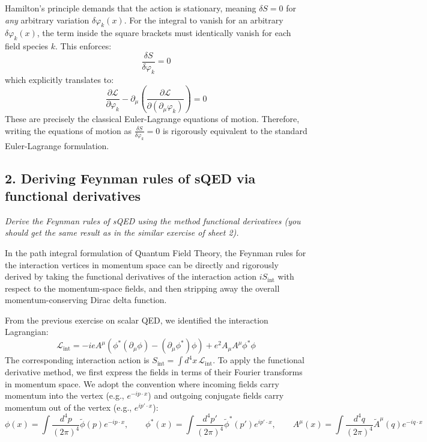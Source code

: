Hamilton's principle demands that the action is stationary, meaning $\delta S = 0$ for \textit{any} arbitrary variation $\delta\varphi_k(x)$. For the integral to vanish for an arbitrary $\delta\varphi_k(x)$, the term inside the square brackets must identically vanish for each field species $k$. This enforces:
\[
    \frac{\delta S}{\delta \varphi_k} = 0
\]
which explicitly translates to:
\[
    \frac{\partial \mathcal{L}}{\partial \varphi_k} - \partial_\mu \left( \frac{\partial \mathcal{L}}{\partial (\partial_\mu \varphi_k)} \right) = 0
\]
These are precisely the classical Euler-Lagrange equations of motion. Therefore, writing the equations of motion as $\frac{\delta S}{\delta \varphi_k} = 0$ is rigorously equivalent to the standard Euler-Lagrange formulation.


\subsection*{2. Deriving Feynman rules of sQED via functional derivatives}

\begin{center}
    \textit{Derive the Feynman rules of sQED using the method functional derivatives (you should get the same result as in the similar exercise of sheet 2).}
\end{center}

In the path integral formulation of Quantum Field Theory, the Feynman rules for the interaction vertices in momentum space can be directly and rigorously derived by taking the functional derivatives of the interaction action $iS_{\text{int}}$ with respect to the momentum-space fields, and then stripping away the overall momentum-conserving Dirac delta function.

From the previous exercise on scalar QED, we identified the interaction Lagrangian:
\[
    \mathcal{L}_{\text{int}} = -ieA^\mu \left( \phi^*(\partial_\mu\phi) - (\partial_\mu\phi^*)\phi \right) + e^2 A_\mu A^\mu \phi^* \phi
\]
The corresponding interaction action is $S_{\text{int}} = \int d^4x \, \mathcal{L}_{\text{int}}$. To apply the functional derivative method, we first express the fields in terms of their Fourier transforms in momentum space. We adopt the convention where incoming fields carry momentum into the vertex (e.g., $e^{-ip\cdot x}$) and outgoing conjugate fields carry momentum out of the vertex (e.g., $e^{ip'\cdot x}$):
\[
    \phi(x) = \int \frac{d^4p}{(2\pi)^4} \tilde{\phi}(p) e^{-ip\cdot x}, \qquad \phi^*(x) = \int \frac{d^4p'}{(2\pi)^4} \tilde{\phi}^*(p') e^{ip'\cdot x}, \qquad A^\mu(x) = \int \frac{d^4q}{(2\pi)^4} \tilde{A}^\mu(q) e^{-iq\cdot x}
\]

